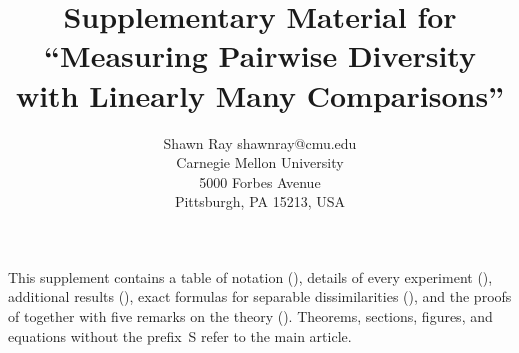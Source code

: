 \documentclass[twoside,11pt]{article}
\begin{document}
\title{Supplementary Material for\\ ``Measuring Pairwise Diversity\\ with Linearly Many Comparisons''}

\author{\name Shawn Ray \email shawnray@cmu.edu \\
       \addr Carnegie Mellon University\\
       5000 Forbes Avenue\\
       Pittsburgh, PA 15213, USA}

\editor{}

\maketitle

\noindent This supplement contains a table of notation
(), details of every experiment (),
additional results (), exact formulas for separable
dissimilarities (), and the proofs of
 together with five remarks on
the theory (). Theorems, sections, figures, and equations without the
prefix~S refer to the main article.











\vskip 0.2in
\setlength{\bibsep}{2pt plus 0.3ex}

\label{supp:last}
\end{document}
